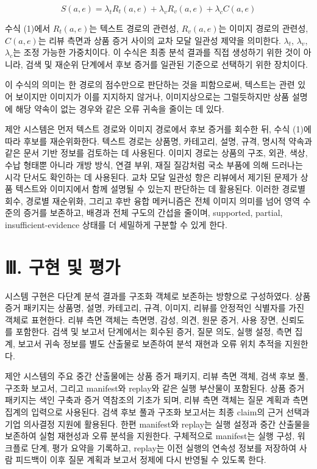 \documentclass[11pt]{article}
\begin{document}
\[
S(a,e) = \lambda_t R_t(a,e) + \lambda_v R_v(a,e) + \lambda_c C(a,e)  \tag{1}
\]

수식 (1)에서 \(R_t(a,e)\)는 텍스트 경로의 관련성, \(R_v(a,e)\)는 이미지 경로의 관련성, \(C(a,e)\)는 리뷰 측면과 상품 증거 사이의 교차 모달 일관성 제약을 의미한다. \(\lambda_t\), \(\lambda_v\), \(\lambda_c\)는 조정 가능한 가중치이다. 이 수식은 최종 분석 결과를 직접 생성하기 위한 것이 아니라, 검색 및 재순위 단계에서 후보 증거를 일관된 기준으로 선택하기 위한 장치이다.

이 수식의 의미는 한 경로의 점수만으로 판단하는 것을 피함으로써, 텍스트는 관련 있어 보이지만 이미지가 이를 지지하지 않거나, 이미지상으로는 그럴듯하지만 상품 설명에 해당 약속이 없는 경우와 같은 오류 귀속을 줄이는 데 있다.

제안 시스템은 먼저 텍스트 경로와 이미지 경로에서 후보 증거를 회수한 뒤, 수식 (1)에 따라 후보를 재순위화한다. 텍스트 경로는 상품명, 카테고리, 설명, 규격, 명시적 약속과 같은 문서 기반 정보를 검토하는 데 사용된다. 이미지 경로는 상품의 구조, 외관, 색상, 수납 형태뿐 아니라 개방 방식, 연결 부위, 재질 질감처럼 국소 부품에 의해 드러나는 시각 단서도 확인하는 데 사용된다. 교차 모달 일관성 항은 리뷰에서 제기된 문제가 상품 텍스트와 이미지에서 함께 설명될 수 있는지 판단하는 데 활용된다. 이러한 경로별 회수, 경로별 재순위화, 그리고 후반 융합 메커니즘은 전체 이미지 의미를 넘어 영역 수준의 증거를 보존하고, 배경과 전체 구도의 간섭을 줄이며, supported, partial, insufficient-evidence 상태를 더 세밀하게 구분할 수 있게 한다.

\section{Ⅲ. 구현 및 평가}
시스템 구현은 다단계 분석 결과를 구조화 객체로 보존하는 방향으로 구성하였다. 상품 증거 패키지는 상품명, 설명, 카테고리, 규격, 이미지, 리뷰를 안정적인 식별자를 가진 객체로 표현한다. 리뷰 측면 객체는 측면명, 감성, 의견, 원문 증거, 사용 장면, 신뢰도를 포함한다. 검색 및 보고서 단계에서는 회수된 증거, 질문 의도, 실행 설정, 측면 집계, 보고서 귀속 정보를 별도 산출물로 보존하여 분석 재현과 오류 위치 추적을 지원한다.

제안 시스템의 주요 중간 산출물에는 상품 증거 패키지, 리뷰 측면 객체, 검색 후보 풀, 구조화 보고서, 그리고 manifest와 replay와 같은 실행 부산물이 포함된다. 상품 증거 패키지는 색인 구축과 증거 역참조의 기초가 되며, 리뷰 측면 객체는 질문 계획과 측면 집계의 입력으로 사용된다. 검색 후보 풀과 구조화 보고서는 최종 claim의 근거 선택과 기업 의사결정 지원에 활용된다. 한편 manifest와 replay는 실행 설정과 중간 산출물을 보존하여 실험 재현성과 오류 분석을 지원한다. 구체적으로 manifest는 실행 구성, 워크플로 단계, 평가 요약을 기록하고, replay는 이전 실행의 연속성 정보를 저장하여 사람 피드백이 이후 질문 계획과 보고서 정제에 다시 반영될 수 있도록 한다.
\end{document}
